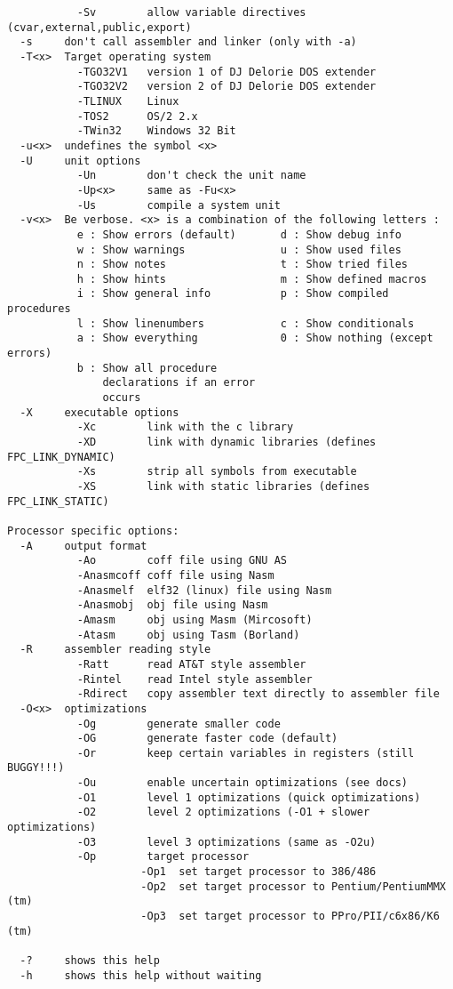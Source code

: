 \documentclass{report}
\begin{document}
\begin{verbatim}
           -Sv        allow variable directives (cvar,external,public,export)
  -s     don't call assembler and linker (only with -a)
  -T<x>  Target operating system
           -TGO32V1   version 1 of DJ Delorie DOS extender
           -TGO32V2   version 2 of DJ Delorie DOS extender
           -TLINUX    Linux
           -TOS2      OS/2 2.x
           -TWin32    Windows 32 Bit
  -u<x>  undefines the symbol <x>
  -U     unit options
           -Un        don't check the unit name
           -Up<x>     same as -Fu<x>
           -Us        compile a system unit
  -v<x>  Be verbose. <x> is a combination of the following letters :
           e : Show errors (default)       d : Show debug info
           w : Show warnings               u : Show used files
           n : Show notes                  t : Show tried files
           h : Show hints                  m : Show defined macros
           i : Show general info           p : Show compiled procedures
           l : Show linenumbers            c : Show conditionals
           a : Show everything             0 : Show nothing (except errors)
           b : Show all procedure
               declarations if an error
               occurs
  -X     executable options
           -Xc        link with the c library
           -XD        link with dynamic libraries (defines FPC_LINK_DYNAMIC)
           -Xs        strip all symbols from executable
           -XS        link with static libraries (defines FPC_LINK_STATIC)

Processor specific options:
  -A     output format
           -Ao        coff file using GNU AS
           -Anasmcoff coff file using Nasm
           -Anasmelf  elf32 (linux) file using Nasm
           -Anasmobj  obj file using Nasm
           -Amasm     obj using Masm (Mircosoft)
           -Atasm     obj using Tasm (Borland)
  -R     assembler reading style
           -Ratt      read AT&T style assembler
           -Rintel    read Intel style assembler
           -Rdirect   copy assembler text directly to assembler file
  -O<x>  optimizations
           -Og        generate smaller code
           -OG        generate faster code (default)
           -Or        keep certain variables in registers (still BUGGY!!!)
           -Ou        enable uncertain optimizations (see docs)
           -O1        level 1 optimizations (quick optimizations)
           -O2        level 2 optimizations (-O1 + slower optimizations)
           -O3        level 3 optimizations (same as -O2u)
           -Op        target processor
                     -Op1  set target processor to 386/486
                     -Op2  set target processor to Pentium/PentiumMMX (tm)
                     -Op3  set target processor to PPro/PII/c6x86/K6 (tm)
  
  -?     shows this help
  -h     shows this help without waiting
\end{verbatim}
\end{document}
